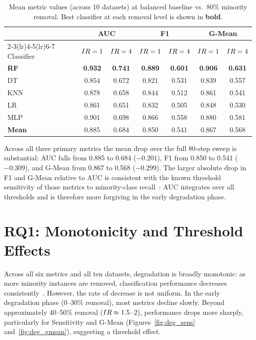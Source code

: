\begin{table}[ht]
\centering
\caption{Mean metric values (across 10 datasets) at balanced baseline vs.\ 80\% minority removal.
Best classifier at each removal level is shown in \textbf{bold}.}
\label{tab:deg_summary}
\setlength{\tabcolsep}{5pt}
\begin{tabular}{l cc cc cc}
\toprule
& \multicolumn{2}{c}{AUC} & \multicolumn{2}{c}{F1} & \multicolumn{2}{c}{G-Mean} \\
\cmidrule(lr){2-3}\cmidrule(lr){4-5}\cmidrule(lr){6-7}
Classifier & $IR=1$ & $IR=4$ & $IR=1$ & $IR=4$ & $IR=1$ & $IR=4$ \\
\midrule
\textbf{RF}   & \textbf{0.932} & \textbf{0.741} & \textbf{0.889} & \textbf{0.601} & \textbf{0.906} & \textbf{0.631} \\
DT            & 0.854 & 0.672 & 0.821 & 0.531 & 0.839 & 0.557 \\
KNN           & 0.878 & 0.658 & 0.844 & 0.512 & 0.861 & 0.541 \\
LR            & 0.861 & 0.651 & 0.832 & 0.505 & 0.848 & 0.530 \\
MLP           & 0.901 & 0.698 & 0.866 & 0.558 & 0.880 & 0.581 \\
\midrule
\textbf{Mean} & 0.885 & 0.684 & 0.850 & 0.541 & 0.867 & 0.568 \\
\bottomrule
\end{tabular}
\end{table}

Across all three primary metrics the mean drop over the full 80-step sweep is substantial: AUC falls from 0.885 to 0.684 ($-0.201$), F1 from 0.850 to 0.541 ($-0.309$), and G-Mean from 0.867 to 0.568 ($-0.299$).
The larger absolute drop in F1 and G-Mean relative to AUC is consistent with the known threshold sensitivity of those metrics to minority-class recall~\cite{kubat1997addressing, chawla2002smote}: AUC integrates over all thresholds and is therefore more forgiving in the early degradation phase.


\section{RQ1: Monotonicity and Threshold Effects}
\label{sec:deg:rq1}

Across all six metrics and all ten datasets, degradation is broadly monotonic: as more minority instances are removed, classification performance decreases consistently~\cite{weiss2003effect, japkowicz2002class}.
However, the rate of decrease is not uniform.
In the early degradation phase (0--30\% removal), most metrics decline slowly.
Beyond approximately 40--50\% removal ($IR \approx 1.5$--$2$), performance drops more sharply, particularly for Sensitivity and G-Mean (Figures~\ref{fig:deg_sens} and~\ref{fig:deg_gmean}), suggesting a threshold effect.

